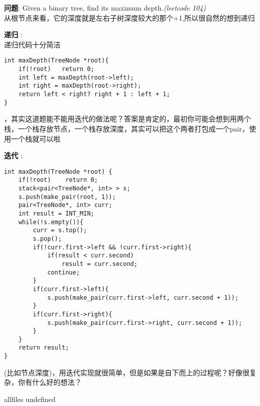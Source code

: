 \documentclass{article}
\begin{document}
\begin{CJK}{UTF8}{gbsn}     %

\else
    
\begin{description}
    \item{\textbf{问题}}: Given a binary tree, find its maximum depth.\textit{(leetcode 104)}
    \\从根节点来看，它的深度就是左右子树深度较大的那个+1,所以很自然的想到递归
    \item{\textbf{递归}} : 
    \\递归代码十分简洁
    \begin{lstlisting}
int maxDepth(TreeNode *root){
    if(!root)   return 0;
    int left = maxDepth(root->left);
    int right = maxDepth(root->right);
    return left < right? right + 1 : left + 1;
}
    \end{lstlisting}
    ，其实这道题能不能用迭代的做法呢？答案是肯定的，最初你可能会想到用两个栈，一个栈存放节点，一个栈存放深度，其实可以把这个两者打包成一个pair，使用一个栈就可以啦
    \item{\textbf{迭代}} : 
    \begin{lstlisting}
int maxDepth(TreeNode *root) {
    if(!root)    return 0;
    stack<pair<TreeNode*, int> > s;
    s.push(make_pair(root, 1));
    pair<TreeNode*, int> curr;
    int result = INT_MIN;
    while(!s.empty()){
        curr = s.top();
        s.pop();
        if(!curr.first->left && !curr.first->right){
            if(result < curr.second)
                result = curr.second;
            continue;
        }
        if(curr.first->left){
            s.push(make_pair(curr.first->left, curr.second + 1));
        }
        if(curr.first->right){
            s.push(make_pair(curr.first->right, curr.second + 1));
        }
    }
    return result;
}
    \end{lstlisting}
    (比如节点深度)，用迭代实现就很简单，但是如果是自下而上的过程呢？好像很复杂，你有什么好的想法？
\end{description}

\fi

\ifx allfiles undefined
\end{CJK}
\end{document}
